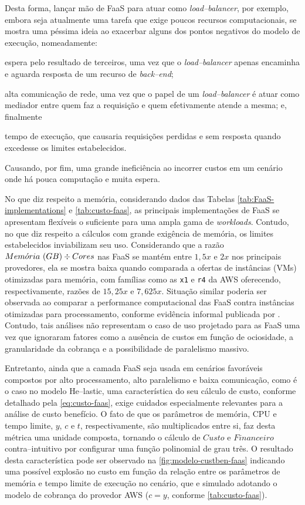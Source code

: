 \documentclass[english,brazilian]{UNISINOSmonografia} %
\begin{document}
Desta forma, lançar mão de FaaS para atuar como \textit{load--balancer}, por exemplo, embora seja atualmente uma tarefa que exige poucos recursos computacionais, se mostra uma péssima ideia ao exacerbar alguns dos pontos negativos do modelo de execução, nomeadamente:
\begin{inparaenum}
	\item espera pelo resultado de terceiros, uma vez que o \textit{load--balancer} apenas encaminha e aguarda resposta de um recurso de \textit{back--end};
	~
	\item alta comunicação de rede, uma vez que o papel de um \textit{load--balancer} é atuar como mediador entre quem faz a requisição e quem efetivamente atende a mesma; e, finalmente
	~
	\item tempo de execução, que causaria requisições perdidas e sem resposta quando excedesse os limites estabelecidos.
\end{inparaenum}
Causando, por fim, uma grande ineficiência ao incorrer custos em um cenário onde há pouca computação e muita espera.


No que diz respeito a memória, considerando dados das Tabelas \ref{tab:FaaS-implementations} e \ref{tab:custo-faas}, as principais implementações de FaaS se apresentam flexíveis o suficiente para uma ampla gama de \textit{workloads}.
Contudo, no que diz respeito a cálculos com grande exigência de memória, os limites estabelecidos inviabilizam seu uso.
Considerando que a razão $ Mem\acute{o}ria~{\small (GB)} \div Cores $ nas FaaS se mantém entre $ 1,5x $ e $ 2x $ nos principais provedores, ela se mostra baixa quando comparada a ofertas de instâncias (VMs) otimizadas para memória, com famílias como as \texttt{x1} e \texttt{r4} da AWS oferecendo, respectivamente, razões de $15,25x$ e $7,625x$.
Situação similar poderia ser observada ao comparar a performance computacional das FaaS contra instâncias otimizadas para processamento, conforme evidência informal publicada por \cite{CloudABC}.
Contudo, tais análises não representam o caso de uso projetado para as FaaS uma vez que ignoraram fatores como a ausência de custos em função de ociosidade, a granularidade da cobrança e a possibilidade de paralelismo massivo.


Entretanto, ainda que a camada FaaS seja usada em cenários favoráveis compostos por alto processamento, alto paralelismo e baixa comunicação, como é o caso no modelo \textsf{He}--lastic, uma característica do seu cálculo de custo, conforme detalhado pela \autoref{eq:custo-faas}, exige cuidados especialmente relevantes para a análise de custo benefício.
O fato de que os parâmetros de memória, CPU e tempo limite, $y$, $c$ e $t$, respectivamente, são multiplicados entre si, faz desta métrica uma unidade composta, tornando o cálculo de $ Custo $ e $ Financeiro $ contra--intuitivo por configurar uma função polinomial de grau três.
O resultado desta característica pode ser observado na \autoref{fig:modelo-custben-faas} indicando uma possível explosão no custo em função da relação entre os parâmetros de memória e tempo limite de execução no cenário, que e simulado adotando o modelo de cobrança do provedor AWS ($ c = y $, conforme \autoref{tab:custo-faas}).
\end{document}
